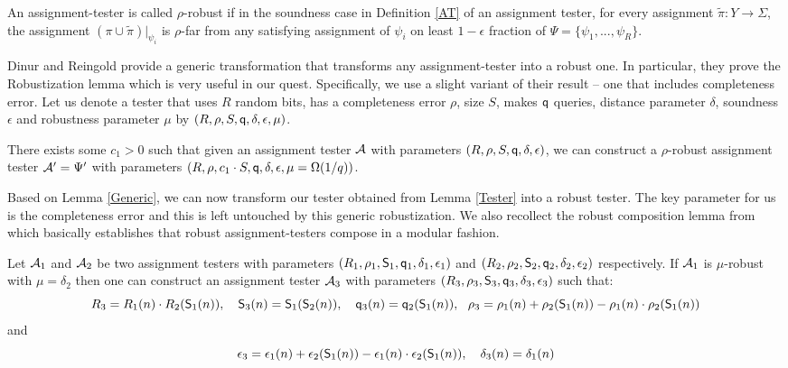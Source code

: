 \begin{definition}\label{RAT}
  An assignment-tester is called $\rho$-robust if in the soundness
  case in Definition \ref{AT} of an assignment tester, for every
  assignment $\tilde{\pi} : Y \rightarrow \Sigma$, the assignment
  $(\pi \cup \tilde{\pi})|_{\psi_i}$ is $\rho$-far from any satisfying
  assignment of $\psi_i$ on least $1 - \epsilon$ fraction of $\Psi =
  \big \{\psi_1, . . . , \psi_R \big\}$.
\end{definition}

Dinur and Reingold \cite{DR} provide a generic transformation that
transforms any assignment-tester into a robust one. In particular,
they prove the Robustization lemma which is very useful in our
quest. Specifically, we use a slight variant of their result -- one
that includes completeness error. Let us denote a tester that uses $R$
random bits, has a completeness error $\rho$, size $S$, makes ${\sf q}$
queries, distance parameter $\delta$, soundness $\epsilon$ and
robustness parameter $\mu$ by $(R, \rho, S, {\sf q}, \delta, \epsilon, \mu)$.

\begin{lemma}\label{Generic}
  There exists some $c_1 > 0$ such that given an assignment tester
  ${\cal A}$ with parameters $(R, \rho, S, {\sf q}, \delta, \epsilon)$, we can
  construct a $\rho$-robust assignment tester ${\cal A}' = \Psi'$ with
  parameters $\left(R, \rho, c_1 \cdot S, {\sf q}, \delta,\epsilon, \mu =
    \Omega(1/q)\right)$.
\end{lemma}

\noindent Based on Lemma \ref{Generic}, we can now transform our
tester obtained from Lemma \ref{Tester} into a robust tester. The key
parameter for us is the completeness error and this is left untouched
by this generic robustization. We also recollect the robust
composition lemma from \cite{DR} which basically establishes that
robust assignment-testers compose in a modular fashion.

\begin{lemma}\label{robust-composition}
  Let ${\cal A}_1$ and ${\cal A}_2$ be two assignment testers with
  parameters $(R_1, \rho_1, {\sf S}_1, {\sf q}_1, \delta_1, \epsilon_1)$ and $(R_2,
  \rho_2, {\sf S}_2, {\sf q}_2, \delta_2, \epsilon_2)$ respectively. If ${\cal A}_1$
  is $\mu$-robust with $\mu = \delta_2$ then one can construct an
  assignment tester ${\cal A}_3$ with parameters $(R_3, \rho_3, {\sf S}_3, {\sf q}_3,
  \delta_3, \epsilon_3)$ such that:
\[
R_3 = R_1(n) \cdot R_2({\sf S}_1(n)), \ \ \ {\sf S}_3(n) = {\sf S}_1({\sf S}_2(n)), \ \ \
{\sf q}_3(n) = {\sf q}_2({\sf S}_1(n)), \ \ \rho_3 = \rho_1(n) + \rho_2({\sf S}_1(n)) - \rho_1(n) \cdot
\rho_2({\sf S}_1(n))\\
\]
and
\[
\epsilon_3 = \epsilon_1(n) + \epsilon_2(\s_1(n)) - \epsilon_1(n) \cdot \epsilon_2(\s_1(n)), \ \ \ \delta_3(n) = \delta_1(n)
\]
\end{lemma}


